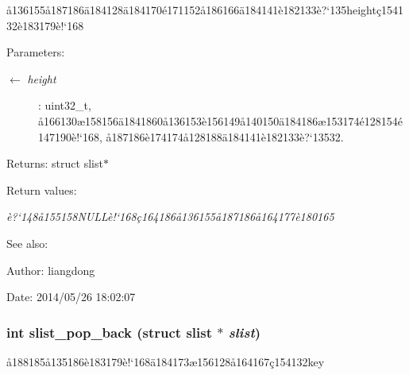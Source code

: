 \aa{}136155\aa{}187186\"{a}184128\"{a}184170\'{e}171152\aa{}186166\"{a}184141\`{e}182133\`{e}?`135height\c{c}154132\`{e}183179\`{e}!`168 

\begin{Desc}
\item[Parameters:]
\begin{description}
\item[\mbox{$\leftarrow$} {\em height}]: uint32\_\-t, \aa{}166130\ae{}158156\"{a}1841860\aa{}136153\`{e}156149\aa{}140150\"{a}184186\ae{}153174\'{e}128154\'{e}147190\`{e}!`168, \aa{}187186\`{e}174174\aa{}128188\"{a}184141\`{e}182133\`{e}?`13532. \end{description}
\end{Desc}
\begin{Desc}
\item[Returns:]struct slist$\ast$ \end{Desc}
\begin{Desc}
\item[Return values:]
\begin{description}
\item[{\em \`{e}?`148\aa{}155158NULL\`{e}!`168\c{c}164186\aa{}136155\aa{}187186\aa{}164177\`{e}180165}]\end{description}
\end{Desc}
\begin{Desc}
\item[See also:]\end{Desc}
\begin{Desc}
\item[Author:]liangdong \end{Desc}
\begin{Desc}
\item[Date:]2014/05/26 18:02:07 \end{Desc}
\subsubsection{\setlength{\rightskip}{0pt plus 5cm}int slist\_\-pop\_\-back (struct slist $\ast$ {\em slist})}\label{slist_8h_a8}


\aa{}188185\aa{}135186\`{e}183179\`{e}!`168\"{a}184173\ae{}156128\aa{}164167\c{c}154132key 

